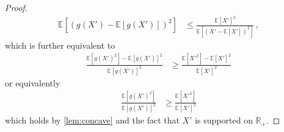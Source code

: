 \documentclass[letter, 12pt]{report}
\newcommand{\R}{\mathbb R}
\newcommand{\E}{\mathbb E}
\newcommand{\1}{\mathbf{1}}
\theoremstyle{plain}
\theoremstyle{definition}
\theoremstyle{remark}
\begin{document}
\begin{proof}
\begin{align*}
{            \E\left[
                \left(g(X')
                - \E[g(X')]\right)^2
                \right]
        }
         & \leq
        \frac{
            \E[X']^2
        }{
            \E\left[
                \left(X' - \E[X']\right)^2
                \right]
        }\,,
    \end{align*}
    which is further equivalent to
    \begin{align*}
        \frac{
            \E[g(X')^2]
            -
            \E[g(X')]^2
        }{
            \E[g(X')]^2
        }
         & \geq
        \frac{
            \E[X'^2]
            -
            \E[X']^2
        }{
            \E[X']^2
        }
    \end{align*}
    or equivalently
    \begin{align}
        \frac{
            \E[g(X')^2]
        }{
            \E[g(X')]^2
        }
         & \geq
        \frac{
            \E[X'^2]
        }{
            \E[X']^2
        }
        \label{ineq:alternative2}
    \end{align}
    which holds by \cref{lem:concave}
    and the fact that $X'$ is supported on $\R_+$.
\end{proof}
\end{document}
